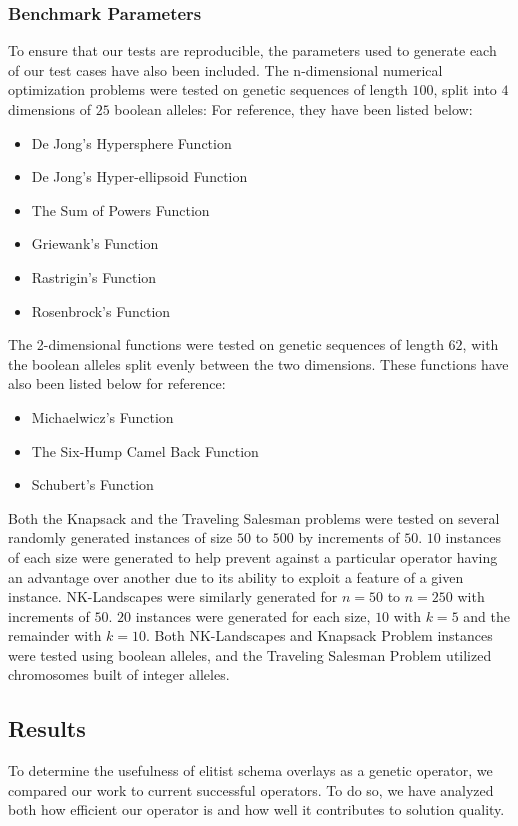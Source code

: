 \subsubsection*{Benchmark Parameters}
To ensure that our tests are reproducible, the parameters used to generate each of our test cases have also been included. The n-dimensional numerical optimization problems were tested on genetic sequences of length $100$, split into $4$ dimensions of $25$ boolean alleles: For reference, they have been listed below:

\begin{itemize}
\item De Jong's Hypersphere Function
\item De Jong's Hyper-ellipsoid Function
\item The Sum of Powers Function
\item Griewank's Function
\item Rastrigin's Function
\item Rosenbrock's Function
\end{itemize} 

The 2-dimensional functions were tested on genetic sequences of length $62$, with the boolean alleles split evenly between the two dimensions. These functions have also been listed below for reference:

\begin{itemize}
\item Michaelwicz's Function
\item The Six-Hump Camel Back Function
\item Schubert's Function
\end{itemize}

Both the Knapsack and the Traveling Salesman problems were tested on several randomly generated instances of size $50$ to $500$ by increments of $50$. $10$ instances of each size were generated to help prevent against a particular operator having an advantage over another due to its ability to exploit a feature of a given instance. NK-Landscapes were similarly generated for $n = 50$ to $n = 250$ with increments of $50$. $20$ instances were generated for each size, $10$ with $k = 5$ and the remainder with $k = 10$. Both NK-Landscapes and Knapsack Problem instances were tested using boolean alleles, and the Traveling Salesman Problem utilized chromosomes built of integer alleles.

\subsection*{Results}
To determine the usefulness of elitist schema overlays as a genetic operator, we compared our work to current successful operators. To do so, we have analyzed both how efficient our operator is and how well it contributes to solution quality. 

